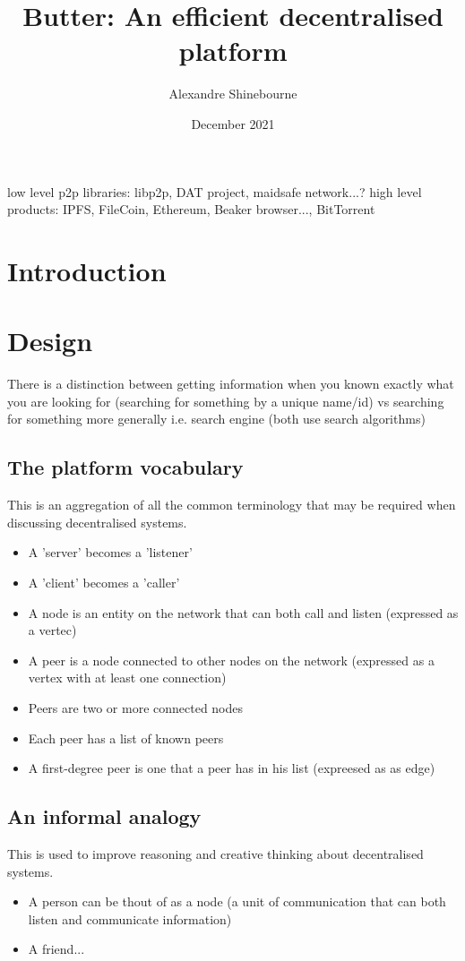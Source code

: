 \documentclass{article}
\title{Butter: An efficient decentralised platform}
\author{Alexandre Shinebourne}
\date{December 2021}
\begin{document}
\maketitle

low level p2p libraries: libp2p, DAT project, maidsafe network...?
high level products: IPFS, FileCoin, Ethereum, Beaker browser..., BitTorrent

\section{Introduction}
\section{Design}
There is a distinction between getting information when you known exactly what you are looking for (searching for something by a unique name/id) vs searching for something more generally i.e. search engine (both use search algorithms)
\subsection{The platform vocabulary}
This is an aggregation of all the common terminology that may be required when discussing decentralised systems.
\begin{itemize}
    \item A 'server' becomes a 'listener'
    \item A 'client' becomes a 'caller'
    \item A node is an entity on the network that can both call and listen (expressed as a vertec)
    \item A peer is a node connected to other nodes on the network (expressed as a vertex with at least one connection)
    \item Peers are two or more connected nodes
    \item Each peer has a list of known peers
    \item A first-degree peer is one that a peer has in his list (expreesed as as edge)
\end{itemize}
\subsection{An informal analogy}
This is used to improve reasoning and creative thinking about decentralised systems.
\begin{itemize}
    \item A person can be thout of as a node (a unit of communication that can both listen and communicate information)
    \item A friend...
\end{itemize}
\end{document}
